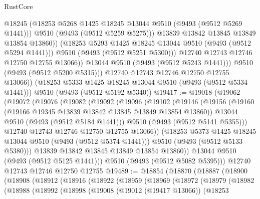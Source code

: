 \begin{lexlean}{RustCore}
\begin{coremodule}
                        @18245
                        (@18253 @5268 @1425 @18245 @13044 @9510 (@9493 (@9512 @5269 @1441)))
                        @9510
                        (@9493 (@9512 @5259 @5275)))
                      @13839
                      @13842
                      @13845
                      @13849
                      @13854
                      @13860))
                  (@18253 @5293 @1425 @18245 @13044 @9510 (@9493 (@9512 @5294 @1441)))
                  @9510
                  (@9493 (@9512 @5251 @5300)))
                @12740
                @12743
                @12746
                @12750
                @12755
                @13066))
            @13044
            @9510
            (@9493 (@9512 @5243 @1441)))
          @9510
          (@9493 (@9512 @5200 @5315)))
        @12740
        @12743
        @12746
        @12750
        @12755
        @13066))
    (@18253 @5333 @1425 @18245 @13044 @9510 (@9493 (@9512 @5334 @1441)))
    @9510
    (@9493 (@9512 @5192 @5340))
@19417 := @19018
    (@19062
      (@19072
        (@19076
          (@19082
            (@19092
              (@19096
                (@19102
                  (@19146
                    (@19156
                      (@19160 (@19166 @19345 @13839 @13842 @13845 @13849 @13854 @13860))
                      @13044
                      @9510
                      (@9493 (@9512 @5184 @1441)))
                    @9510
                    (@9493 (@9512 @5141 @5355)))
                  @12740
                  @12743
                  @12746
                  @12750
                  @12755
                  @13066))
              (@18253 @5373 @1425 @18245 @13044 @9510 (@9493 (@9512 @5374 @1441)))
              @9510
              (@9493 (@9512 @5133 @5380)))
            @13839
            @13842
            @13845
            @13849
            @13854
            @13860))
        @13044
        @9510
        (@9493 (@9512 @5125 @1441)))
      @9510
      (@9493 (@9512 @5082 @5395)))
    @12740
    @12743
    @12746
    @12750
    @12755
@19489 := @18854
    (@18870
      (@18887
        (@18900
          (@18908
            (@18912
              (@18916
                (@18922
                  (@18959
                    (@18969
                      (@18972
                        (@18979
                          (@18982
                            (@18988
                              (@18992
                                (@18998
                                  (@19008
                                    (@19012 (@19417 @13066))
                                    (@18253

\end{coremodule}
\end{lexlean}

